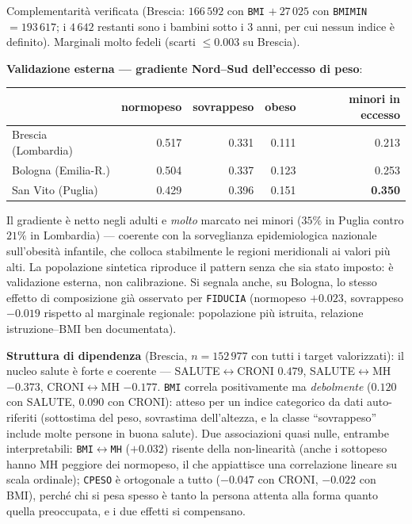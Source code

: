 \documentclass[11pt,a4paper]{article}
\newcommand{\code}[1]{\texttt{#1}}
\begin{document}
\medskip\noindent Complementarit\`a verificata (Brescia:
$166\,592$ con \code{BMI} $+\ 27\,025$ con \code{BMIMIN} $=193\,617$; i
$4\,642$ restanti sono i bambini sotto i 3 anni, per cui nessun indice \`e
definito). Marginali molto fedeli (scarti $\le0.003$ su Brescia).

\medskip\noindent\textbf{Validazione esterna --- gradiente Nord--Sud
dell'eccesso di peso}:
\begin{center}\small
\begin{tabular}{@{}lrrrr@{}}
\toprule
& normopeso & sovrappeso & obeso & \textbf{minori in eccesso}\\
\midrule
Brescia (Lombardia) & 0.517 & 0.331 & 0.111 & 0.213\\
Bologna (Emilia-R.) & 0.504 & 0.337 & 0.123 & 0.253\\
San Vito (Puglia) & 0.429 & 0.396 & 0.151 & \textbf{0.350}\\
\bottomrule
\end{tabular}
\end{center}
\noindent Il gradiente \`e netto negli adulti e \emph{molto} marcato nei
minori ($35\%$ in Puglia contro $21\%$ in Lombardia) --- coerente con la
sorveglianza epidemiologica nazionale sull'obesit\`a infantile, che
colloca stabilmente le regioni meridionali ai valori pi\`u alti. La
popolazione sintetica riproduce il pattern senza che sia stato imposto:
\`e validazione esterna, non calibrazione. Si segnala anche, su Bologna,
lo stesso effetto di composizione gi\`a osservato per \code{FIDUCIA}
(normopeso $+0.023$, sovrappeso $-0.019$ rispetto al marginale regionale:
popolazione pi\`u istruita, relazione istruzione--BMI ben documentata).

\medskip\noindent\textbf{Struttura di dipendenza} (Brescia,
$n=152\,977$ con tutti i target valorizzati): il nucleo salute \`e forte e
coerente --- SALUTE$\leftrightarrow$CRONI $0.479$,
SALUTE$\leftrightarrow$MH $-0.373$, CRONI$\leftrightarrow$MH $-0.177$.
\code{BMI} correla positivamente ma \emph{debolmente} ($0.120$ con
SALUTE, $0.090$ con CRONI): atteso per un indice categorico da dati
auto-riferiti (sottostima del peso, sovrastima dell'altezza, e la classe
``sovrappeso'' include molte persone in buona salute). Due associazioni
quasi nulle, entrambe interpretabili: \code{BMI}$\leftrightarrow$\code{MH}
($+0.032$) risente della non-linearit\`a (anche i sottopeso hanno MH
peggiore dei normopeso, il che appiattisce una correlazione lineare su
scala ordinale); \code{CPESO} \`e ortogonale a tutto ($-0.047$ con CRONI,
$-0.022$ con BMI), perch\'e chi si pesa spesso \`e tanto la persona attenta
alla forma quanto quella preoccupata, e i due effetti si compensano.
\end{document}
